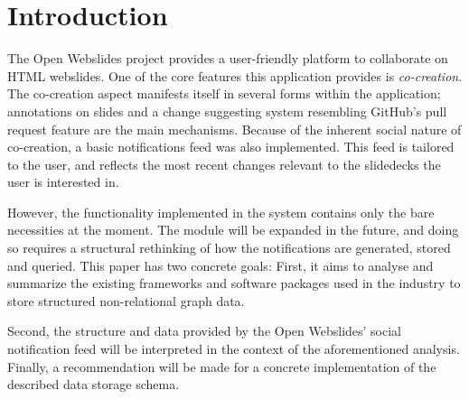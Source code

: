 \documentclass[fleqn,10pt]{voorstel}
\affiliation{\textbf{Contact:} \href{mailto:florian@floriandejonckheere.be}{florian@floriandejonckheere.be}}
\begin{document}
\flushbottom %
\maketitle %
\tableofcontents %
\thispagestyle{empty} %



\section{Introduction} %
\label{sec:introduction}


The Open Webslides project provides a user-friendly platform to collaborate on HTML webslides. One of the core features this application provides is \emph{co-creation}. The co-creation aspect manifests itself in several forms within the application; annotations on slides and a change suggesting system resembling GitHub's pull request feature are the main mechanisms. Because of the inherent social nature of co-creation, a basic notifications feed was also implemented. This feed is tailored to the user, and reflects the most recent changes relevant to the slidedecks the user is interested in.

However, the functionality implemented in the system contains only the bare necessities at the moment. The module will be expanded in the future, and doing so requires a structural rethinking of how the notifications are generated, stored and queried. This paper has two concrete goals: First, it aims to analyse and summarize the existing frameworks and software packages used in the industry to store structured non-relational graph data.

Second, the structure and data provided by the Open Webslides' social notification feed will be interpreted in the context of the aforementioned analysis. Finally, a recommendation will be made for a concrete implementation of the described data storage schema.
\end{document}
